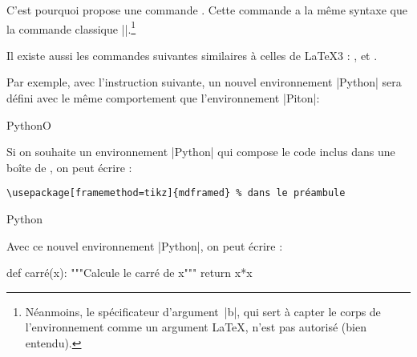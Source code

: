 \documentclass[dvipsnames,svgnames]{article}
\begin{document}
C'est pourquoi  propose une commande .
Cette commande a la même syntaxe que la commande classique
|\NewDocumentEnvironment|.\footnote{Néanmoins, le spécificateur d'argument~|b|, qui sert à
  capter le corps de l'environnement comme un argument LaTeX, n'est pas autorisé
  (bien entendu).}

\medskip
Il existe aussi les commandes suivantes similaires à celles de LaTeX3 :
,
 et .



\bigskip
Par exemple, avec l'instruction suivante, un nouvel environnement |{Python}| sera défini
avec le même comportement que l'environnement |{Piton}|:

\medskip
\begin{Code}
\emph{\NewPitonEnvironment}{Python}{O{}}{}{}
\end{Code}

\bigskip
Si on souhaite un environnement |{Python}| qui compose le code inclus dans une boîte de
, on peut écrire :

\begin{footnotesize}
\begin{Verbatim}
\usepackage[framemethod=tikz]{mdframed} % dans le préambule
\end{Verbatim}
\end{footnotesize}

\medskip
\begin{Code}
\emph{\NewPitonEnvironment}{Python}{}
  {\begin{mdframed}[roundcorner=3mm]}
  {\end{mdframed}}
\end{Code}

\bigskip
Avec ce nouvel environnement |{Python}|, on peut écrire : 

\medskip
{}

  {\begin{mdframed}[roundcorner=3mm]}
  {\end{mdframed}}

\begin{Python}
def carré(x):
    """Calcule le carré de x"""
    return x*x
\end{Python}
\end{document}
